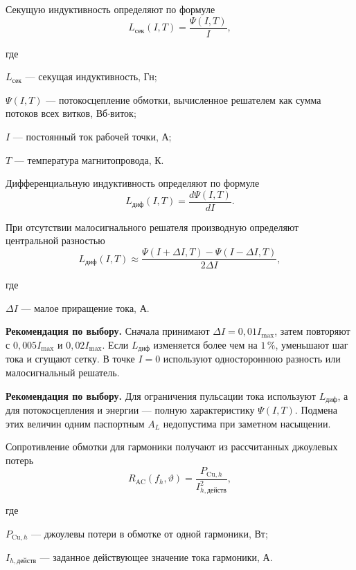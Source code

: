\documentclass[14pt,a4paper]{extarticle}
\newcommand{\recommend}{\par\noindent\textbf{Рекомендация по выбору.} }
\newenvironment{whereblock}
 {\par\noindent где\par
  \begin{list}{}{\setlength{\leftmargin}{12.5mm}
                  \setlength{\itemindent}{-12.5mm}
                  \setlength{\itemsep}{0pt}
                  \setlength{\parsep}{0pt}
                  \setlength{\topsep}{0pt}}}
 {\end{list}}
\newcommand{\whereitem}[2]{\item[] #1 --- #2}
\begin{document}
Секущую индуктивность определяют по формуле
\begin{equation}
 L_{\text{сек}}(I,T)=\frac{\Psi(I,T)}{I},
 \label{eq:secant-inductance}
\end{equation}
\begin{whereblock}
\whereitem{$L_{\text{сек}}$}{секущая индуктивность, Гн;}
\whereitem{$\Psi(I,T)$}{потокосцепление обмотки, вычисленное решателем как
сумма потоков всех витков, Вб$\cdot$виток;}
\whereitem{$I$}{постоянный ток рабочей точки, А;}
\whereitem{$T$}{температура магнитопровода, К.}
\end{whereblock}

Дифференциальную индуктивность определяют по формуле
\begin{equation}
 L_{\text{диф}}(I,T)=\frac{d\Psi(I,T)}{dI}.
 \label{eq:differential-inductance}
\end{equation}

При отсутствии малосигнального решателя производную определяют центральной
разностью
\begin{equation}
 L_{\text{диф}}(I,T)\approx
 \frac{\Psi(I+\Delta I,T)-\Psi(I-\Delta I,T)}
 {2\Delta I},
 \label{eq:differential-inductance-fd}
\end{equation}
\begin{whereblock}
\whereitem{$\Delta I$}{малое приращение тока, А.}
\end{whereblock}

\recommend Сначала принимают $\Delta I=0{,}01I_{\max}$, затем повторяют с
$0{,}005I_{\max}$ и $0{,}02I_{\max}$. Если $L_{\text{диф}}$ изменяется более
чем на $1\,\%$, уменьшают шаг тока и сгущают сетку. В точке $I=0$ используют
одностороннюю разность или малосигнальный решатель.

\recommend Для ограничения пульсации тока используют
$L_{\text{диф}}$, а для потокосцепления и энергии --- полную
характеристику $\Psi(I,T)$. Подмена этих величин одним паспортным
$A_L$ недопустима при заметном насыщении.

Сопротивление обмотки для гармоники получают из рассчитанных джоулевых
потерь
\begin{equation}
 R_{\text{AC}}(f_h,\vartheta)=
 \frac{P_{\text{Cu},h}}
 {I_{h,\text{действ}}^2},
 \label{eq:rac-from-fem}
\end{equation}
\begin{whereblock}
\whereitem{$P_{\text{Cu},h}$}{джоулевы потери в обмотке от одной гармоники,
Вт;}
\whereitem{$I_{h,\text{действ}}$}{заданное действующее значение тока
гармоники, А.}
\end{whereblock}
\end{document}
